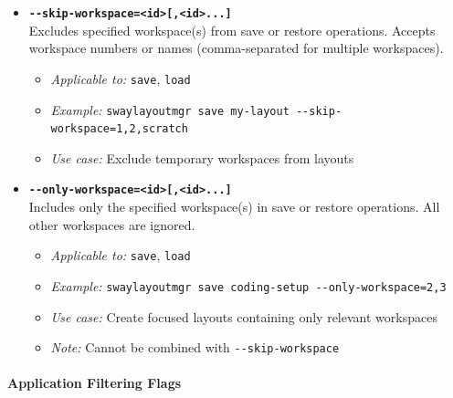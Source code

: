 \begin{itemize}
    \item \textbf{\texttt{-{}-skip-workspace=<id>[,<id>...]}} \\
    Excludes specified workspace(s) from save or restore operations. Accepts workspace numbers or names (comma-separated for multiple workspaces).
    \begin{itemize}
        \item \textit{Applicable to:} \texttt{save}, \texttt{load}
        \item \textit{Example:} \texttt{swaylayoutmgr save my-layout -{}-skip-workspace=1,2,scratch}
        \item \textit{Use case:} Exclude temporary workspaces from layouts
    \end{itemize}

    \item \textbf{\texttt{-{}-only-workspace=<id>[,<id>...]}} \\
    Includes only the specified workspace(s) in save or restore operations. All other workspaces are ignored.
    \begin{itemize}
        \item \textit{Applicable to:} \texttt{save}, \texttt{load}
        \item \textit{Example:} \texttt{swaylayoutmgr save coding-setup -{}-only-workspace=2,3}
        \item \textit{Use case:} Create focused layouts containing only relevant workspaces
        \item \textit{Note:} Cannot be combined with \texttt{-{}-skip-workspace}
    \end{itemize}
\end{itemize}

\paragraph{Application Filtering Flags}

